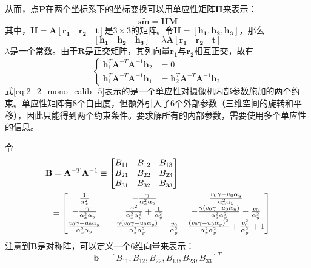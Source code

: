 从而，点$\mathbf{P}$在两个坐标系下的坐标变换可以用单应性矩阵$\mathbf{H}$来表示：
%
\begin{equation}\label{eq:2_2_mono_calib_3}
s \tilde{\mathbf{m}} = \mathbf{H} \tilde{\mathbf{M}}
\end{equation}
其中，$\mathbf{H} = \mathbf{A} [ \mathbf{r_1} \quad \mathbf{r_2} \quad \mathbf{t} ]$是$3\times 3$的矩阵。令$\mathbf{H} = [\mathbf{h_1}, \mathbf{h_2}, \mathbf{h_3}]$，那么
%
\begin{equation}\label{eq:2_2_mono_calib_4}
[\mathbf{h_1} \quad \mathbf{h_2} \quad \mathbf{h_3}]
= \lambda \mathbf{A} [ \mathbf{r_1} \quad \mathbf{r_2} \quad \mathbf{t} ]
\end{equation}
$\lambda$是一个常数。由于$\mathbf{R}$是正交矩阵，其列向量$\mathbf{r_1}$与$\mathbf{r_2}$相互正交，故有
%
\begin{equation}\label{eq:2_2_mono_calib_5}
\left\{
\begin{aligned}
\mathbf{h}_1^T\mathbf{A}^{-T}\mathbf{A}^{-1}\mathbf{h}_2 &= 0 \\
\mathbf{h}_1^T\mathbf{A}^{-T}\mathbf{A}^{-1}\mathbf{h}_1 &= \mathbf{h}_2^T\mathbf{A}^{-T}\mathbf{A}^{-1}\mathbf{h}_2 
\end{aligned}
\right.
\end{equation}
式\ref{eq:2_2_mono_calib_5}表示的是一个单应性对摄像机内部参数施加的两个约束。单应性矩阵有8个自由度，但额外引入了6个外部参数（三维空间的旋转和平移），因此只能得到两个约束条件。要求解所有的内部参数，需要使用多个单应性的信息。

令
%
\begin{equation}\label{eq:2_2_mono_calib_6}
\begin{split}
\mathbf{B} = \mathbf{A}^{-T} \mathbf{A}^{-1} \equiv
\begin{bmatrix}
B_{11} & B_{12} & B_{13} \\
B_{21} & B_{22} & B_{23} \\
B_{31} & B_{32} & B_{33} \\
\end{bmatrix} \hspace{1.5in}
\\
=
\begin{bmatrix}
\frac{1}{\alpha_x^2} &
-\frac{\gamma}{\alpha_x^2 \alpha_y} &
\frac{v_0\gamma - u_0 \alpha_y}{\alpha_x^2 \alpha_y} \\
-\frac{\gamma}{\alpha_x^2 \alpha_y} &
\frac{\gamma^2}{\alpha_x^2 \alpha_y^2} + \frac{1}{\alpha_y^2} &
-\frac{\gamma(v_0 \gamma - u_0 \alpha_y)}{\alpha_x^2 \alpha_y^2} - \frac{v_0}{\alpha_y^2} \\
\frac{v_0 \gamma - u_0 \alpha_y}{\alpha_x^2 \alpha_y} &
-\frac{\gamma (v_0 \gamma - u_0 \alpha_y)}{\alpha_x^2 \alpha_y^2} - \frac{v_0}{\alpha_y^2} &
\frac{ (v_0 \gamma - u_0 \alpha_y)^2 }{\alpha_x^2 \alpha_y^2} + \frac{v_0^2}{\alpha_y^2} + 1
\end{bmatrix}
\end{split}
\end{equation}
注意到$\mathbf{B}$是对称阵，可以定义一个6维向量来表示：
%
\begin{equation}\label{eq:2_2_mono_calib_7}
\mathbf{b} = [B_{11}, B_{12}, B_{22}, B_{13}, B_{23}, B_{33}]^T
\end{equation}


